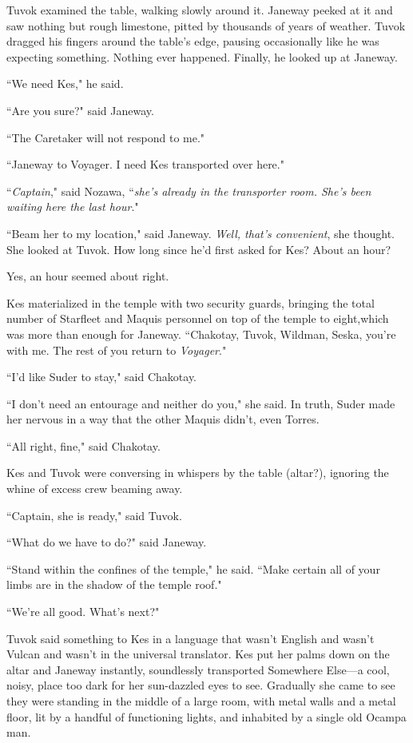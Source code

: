 \documentclass[twoside,letterpaper,12pt]{memoir}
\begin{document}
Tuvok examined the table, walking slowly around it. Janeway peeked at it and saw nothing but rough limestone, pitted by thousands of years of weather. Tuvok dragged his fingers around the table's edge, pausing occasionally like he was expecting something. Nothing ever happened. Finally, he looked up at Janeway. 

``We need Kes," he said. 

``Are you sure?" said Janeway. 

``The Caretaker will not respond to me." 

``Janeway to Voyager. I need Kes transported over here." 

``\textit{Captain}," said Nozawa, ``\textit{she's already in the transporter room. She's been waiting here the last hour}." 

``Beam her to my location," said Janeway. \textit{Well, that's convenient}, she thought. She looked at Tuvok. How long since he'd first asked for Kes? About an hour? 

Yes, an hour seemed about right. 

Kes materialized in the temple with two security guards, bringing the total number of Starfleet and Maquis personnel on top of the temple to eight,which was more than enough for Janeway. ``Chakotay, Tuvok, Wildman, Seska, you're with me. The rest of you return to \textit{Voyager}." 

``I'd like Suder to stay," said Chakotay.

``I don't need an entourage and neither do you," she said. In truth, Suder made her nervous in a way that the other Maquis didn't, even Torres.

``All right, fine," said Chakotay.

Kes and Tuvok were conversing in whispers by the table (altar?), ignoring the whine of excess crew beaming away. 

``Captain, she is ready," said Tuvok. 

``What do we have to do?" said Janeway. 

``Stand within the confines of the temple," he said. ``Make certain all of your limbs are in the shadow of the temple roof." 

``We're all good. What's next?" 

Tuvok said something to Kes in a language that wasn't English and wasn't Vulcan and wasn't in the universal translator. Kes put her palms down on the altar and Janeway instantly, soundlessly transported Somewhere Else---a cool, noisy, place too dark for her sun-dazzled eyes to see. Gradually she came to see they were standing in the middle of a large room, with metal walls and a metal floor, lit by a handful of functioning lights, and inhabited by a single old Ocampa man. 
\end{document}
